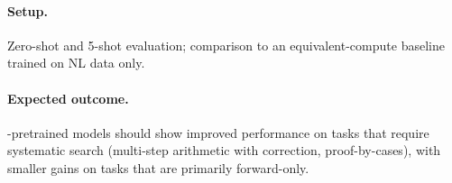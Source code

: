 \paragraph{Setup.}
Zero-shot and 5-shot evaluation; comparison to an equivalent-compute baseline
trained on NL data only.

\paragraph{Expected outcome.}
\gore{}-pretrained models should show improved performance on tasks that require
systematic search (multi-step arithmetic with correction, proof-by-cases), with
smaller gains on tasks that are primarily forward-only.


